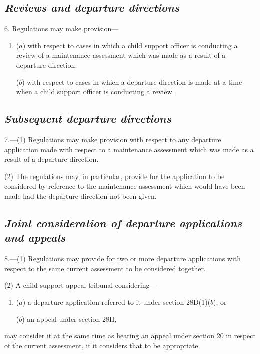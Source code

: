 \documentclass[12pt,a4paper]{article}
\begin{document}

\subsection*{\itshape Reviews and departure directions}

6. Regulations may make provision—
\begin{enumerate}\item[]
($a$) with respect to cases in which a child support officer is conducting a review of a maintenance assessment which was made as a result of a departure direction;

($b$) with respect to cases in which a departure direction is made at a time when a child support officer is conducting a review.
\end{enumerate}

\subsection*{\itshape Subsequent departure directions}

7.---(1) Regulations may make provision with respect to any departure application made with respect to a maintenance assessment which was made as a result of a departure direction.

(2) The regulations may, in particular, provide for the application to be considered by reference to the maintenance assessment which would have been made had the departure direction not been given.

\subsection*{\itshape Joint consideration of departure applications and appeals}

8.---(1) Regulations may provide for two or more departure applications with respect to the same current assessment to be considered together.

(2) 
A child support appeal tribunal 
considering—
\begin{enumerate}\item[]
($a$) a departure application referred to it under section 28D(1)($b$), or

($b$) an appeal under section 28H,
\end{enumerate}
may consider it at the same time as hearing an appeal under section 20 in respect of the current assessment, if it considers that to be appropriate.
\end{document}
